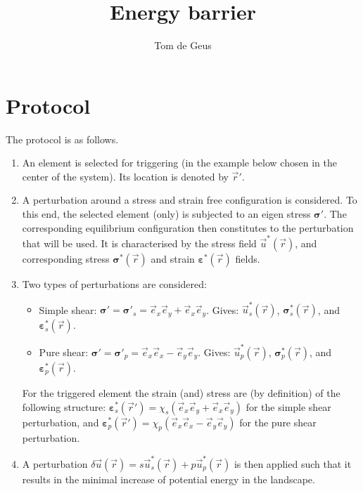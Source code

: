 \documentclass[fleqn]{goose-article}
\title{Energy barrier}
\author{Tom de Geus}
\begin{document}
\maketitle

\section*{Protocol}

The protocol is as follows.
\begin{enumerate}
    \item An element is selected for triggering
    (in the example below chosen in the center of the system).
    Its location is denoted by $\vec{r}'$.

    \item A perturbation around a stress and strain free configuration is considered.
    To this end, the selected element (only) is subjected to an eigen stress
    $\bm{\sigma}'$.
    The corresponding equilibrium configuration then constitutes to
    the perturbation that will be used.
    It is characterised by the stress field $\vec{u}^* (\vec{r})$, and corresponding
    stress $\bm{\sigma}^* (\vec{r})$
    and strain $\bm{\varepsilon}^* (\vec{r})$ fields.

    \item Two types of perturbations are considered:
    \begin{itemize}
        \item Simple shear:
        $\bm{\sigma}' = \bm{\sigma}'_s = \vec{e}_x \vec{e}_y + \vec{e}_x \vec{e}_y$.
        Gives: $\vec{u}^*_s (\vec{r})$, $\bm{\sigma}^*_s (\vec{r})$, and
        $\bm{\varepsilon}^*_s (\vec{r})$.

        \item Pure shear:
        $\bm{\sigma}' = \bm{\sigma}'_p = \vec{e}_x \vec{e}_x - \vec{e}_y \vec{e}_y$.
        Gives: $\vec{u}^*_p (\vec{r})$, $\bm{\sigma}^*_p (\vec{r})$, and
        $\bm{\varepsilon}^*_p (\vec{r})$.
    \end{itemize}

    For the triggered element the strain (and) stress are (by definition)
    of the following structure:
    $\bm{\varepsilon}^*_s (\vec{r}') = \chi_s (\vec{e}_x \vec{e}_y + \vec{e}_x \vec{e}_y)$
    for the simple shear perturbation, and
    $\bm{\varepsilon}^*_p (\vec{r}') = \chi_p (\vec{e}_x \vec{e}_x - \vec{e}_y \vec{e}_y)$
    for the pure shear perturbation.

    \item A perturbation $\delta \vec{u}(\vec{r}) = s \vec{u}^*_s (\vec{r}) + p \vec{u}^*_p (\vec{r})$
    is then applied such that it results in the minimal increase of potential energy in the
    landscape.

\end{enumerate}
\end{document}
